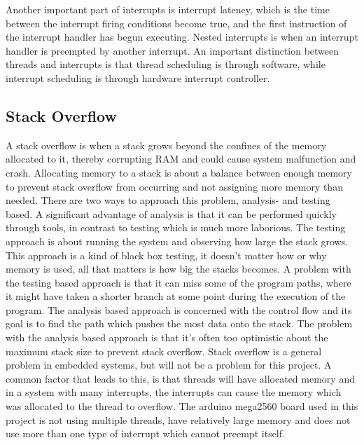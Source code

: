 Another important part of interrupts is interrupt latency, which is the time between the interrupt firing conditions become true, and the first instruction of the interrupt handler has begun executing. Nested interrupts is when an interrupt handler is preempted by another interrupt. An important distinction between threads and interrupts is that thread scheduling is through software, while interrupt scheduling is through hardware interrupt controller.

\subsection{Stack Overflow}
\label{sec:Stack Overflow}
A stack overflow is when a stack grows beyond the confines of the memory allocated to it, thereby corrupting RAM and could cause system malfunction and crash. Allocating memory to a stack is about a balance between enough memory to prevent stack overflow from occurring and not assigning more memory than needed. There are two ways to approach this problem, analysis- and testing based. A significant advantage of analysis is that it can be performed quickly through tools, in contrast to testing which is much more laborious. \newline
The testing approach is about running the system and observing how large the stack grows. This approach is a kind of black box testing, it doesn’t matter how or why memory is used, all that matters is how big the stacks becomes. A problem with the testing based approach is that it can miss some of the program paths, where it might have taken a shorter branch at some point during the execution of the program. \newline
The analysis based approach is concerned with the control flow and its goal is to find the path which pushes the most data onto the stack. The problem with the analysis based approach is that it's often too optimistic about the maximum stack size to prevent stack overflow. \newline
Stack overflow is a general problem in embedded systems, but will not be a problem for this project. A common factor that leads to this, is that threads will have allocated memory and in a system with many interrupts, the interrupts can cause the memory which was allocated to the thread to overflow. The arduino mega2560 board used in this project is not using multiple threads, have relatively large memory and does not use more than one type of interrupt which cannot preempt itself. 


